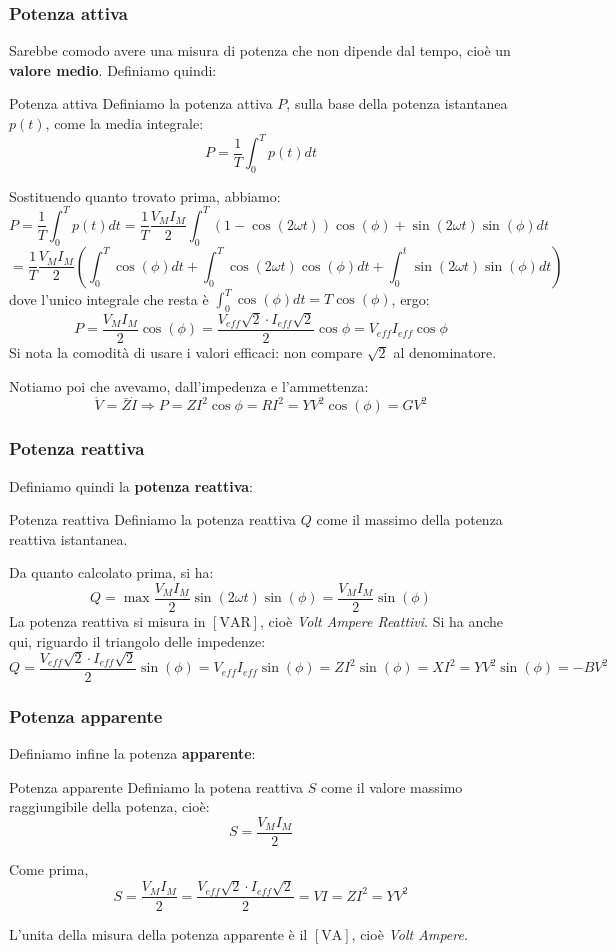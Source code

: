 \documentclass[a4paper,11pt]{article}
\begin{document}
\subsubsection{Potenza attiva}
Sarebbe comodo avere una misura di potenza che non dipende dal tempo, cioè un \textbf{valore medio}.
Definiamo quindi:
\begin{definition}{Potenza attiva}
	Definiamo la potenza attiva $P$, sulla base della potenza istantanea $p(t)$, come la media integrale:
	$$
		P = \frac{1}{T} \int_0^T p(t) dt
	$$
\end{definition}

Sostituendo quanto trovato prima, abbiamo:
$$
P = \frac{1}{T} \int_0^T p(t) dt = \frac{1}{T} \frac{V_M I_M}{2} \int_0^T \left( 1 - \cos(2\omega t) \right) \cos(\phi) +  \sin(2\omega t)\sin(\phi)  dt
$$
$$
= \frac{1}{T} \frac{V_M I_M}{2} \left( \int_0^T \cos(\phi) dt + \int_0^T \cos(2\omega t) \cos(\phi) dt + \int_0^t \sin(2\omega t)\sin(\phi)  dt \right) 
$$
dove l'unico integrale che resta è $\int_0^T \cos(\phi) dt = T \cos(\phi)$, ergo: 
$$
P= \frac{V_M I_M}{2} \cos(\phi) = \frac{V_{eff} \sqrt{2} \cdot I_{eff} \sqrt{2}}{2} \cos{\phi} = V_{eff}I_{eff} \cos{\phi}
$$
Si nota la comodità di usare i valori efficaci: non compare $\sqrt{2}$ al denominatore.

Notiamo poi che avevamo, dall'impedenza e l'ammettenza:
$$
\dot V = \bar{Z} \dot{I}  \Rightarrow P = Z I^2 \cos{\phi} = R I^2 = Y V^2 \cos(\phi) = G V^2 
$$

\subsubsection{Potenza reattiva}
Definiamo quindi la \textbf{potenza reattiva}:
\begin{definition}{Potenza reattiva}
	Definiamo la potenza reattiva $Q$ come il massimo della potenza reattiva istantanea.
\end{definition}

Da quanto calcolato prima, si ha:
$$
Q = \max{\frac{V_M I_M}{2} \sin(2\omega t)\sin(\phi)} = \frac{V_M I_M}{2} \sin(\phi)
$$
La potenza reattiva si misura in $[\mathrm{VAR}]$, cioè \textit{Volt Ampere Reattivi}.
Si ha anche qui, riguardo il triangolo delle impedenze:
$$
Q = \frac{V_{eff} \sqrt{2} \cdot I_{eff} \sqrt{2}}{2} \sin(\phi) = V_{eff}I_{eff} \sin(\phi) = ZI^2 \sin(\phi) = XI^2 = YV^2 \sin(\phi) = - BV^2
$$

\subsubsection{Potenza apparente}
Definiamo infine la potenza \textbf{apparente}:
\begin{definition}{Potenza apparente}
	Definiamo la potena reattiva $S$ come il valore massimo raggiungibile della potenza, cioè:
	$$
	S = \frac{V_M I_M}{2}
	$$
\end{definition}

Come prima, 
$$
S = \frac{V_M I_M}{2} = \frac{V_{eff} \sqrt{2} \cdot I_{eff} \sqrt{2}}{2} = VI = ZI^2 = Y V^2
$$

L'unita della misura della potenza apparente è il $[\mathrm{VA}]$, cioè \textit{Volt Ampere}.
\end{document}
